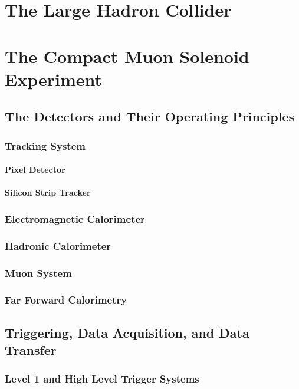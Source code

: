 \documentclass[12pt, letterpaper]{report}
\begin{document}
\chapter{The Large Hadron Collider}

\chapter{The Compact Muon Solenoid Experiment}
\section{The Detectors and Their Operating Principles}
\subsection{Tracking System}
\subsubsection{Pixel Detector}
\subsubsection{Silicon Strip Tracker}
\subsection{Electromagnetic Calorimeter}
\subsection{Hadronic Calorimeter}
\subsection{Muon System}
\subsection{Far Forward Calorimetry}
\section{Triggering, Data Acquisition, and Data Transfer}
\subsection{Level 1 and High Level Trigger Systems}
\end{document}
